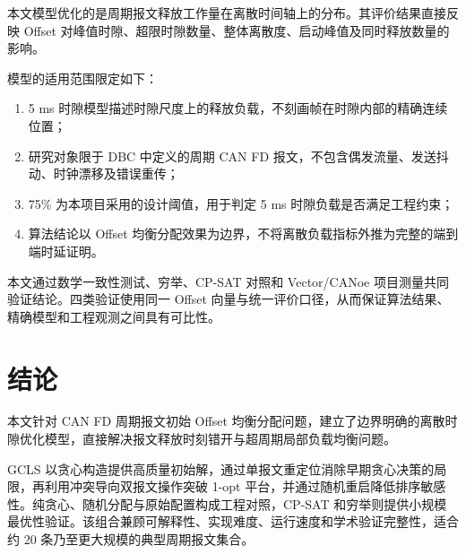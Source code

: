 \documentclass[UTF8,12pt,a4paper]{ctexart}
\begin{document}
本文模型优化的是周期报文释放工作量在离散时间轴上的分布。其评价结果直接反映 Offset 对峰值时隙、超限时隙数量、整体离散度、启动峰值及同时释放数量的影响。

模型的适用范围限定如下：

\begin{enumerate}
  \item 5 ms 时隙模型描述时隙尺度上的释放负载，不刻画帧在时隙内部的精确连续位置；
  \item 研究对象限于 DBC 中定义的周期 CAN FD 报文，不包含偶发流量、发送抖动、时钟漂移及错误重传；
  \item 75\% 为本项目采用的设计阈值，用于判定 5 ms 时隙负载是否满足工程约束；
  \item 算法结论以 Offset 均衡分配效果为边界，不将离散负载指标外推为完整的端到端时延证明。
\end{enumerate}

本文通过数学一致性测试、穷举、CP-SAT 对照和 Vector/CANoe 项目测量共同验证结论。四类验证使用同一 Offset 向量与统一评价口径，从而保证算法结果、精确模型和工程观测之间具有可比性。

\section{结论}

本文针对 CAN FD 周期报文初始 Offset 均衡分配问题，建立了边界明确的离散时隙优化模型，直接解决报文释放时刻错开与超周期局部负载均衡问题。

GCLS 以贪心构造提供高质量初始解，通过单报文重定位消除早期贪心决策的局限，再利用冲突导向双报文操作突破 1-opt 平台，并通过随机重启降低排序敏感性。纯贪心、随机分配与原始配置构成工程对照，CP-SAT 和穷举则提供小规模最优性验证。该组合兼顾可解释性、实现难度、运行速度和学术验证完整性，适合约 20 条乃至更大规模的典型周期报文集合。
\end{document}
